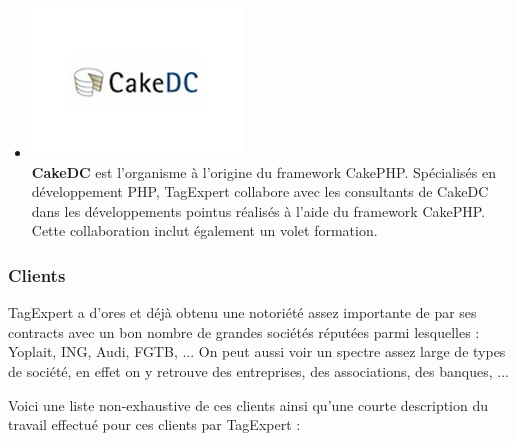 \documentclass{article}
\begin{document}
\begin{sffamily}
\begin{itemize}
\item[] \includegraphics[scale=0.35]{cakedc.jpg}\\
\textbf{CakeDC} est l’organisme à l’origine du framework CakePHP. Spécialisés en développement PHP, TagExpert collabore avec les consultants de CakeDC dans les 
développements pointus réalisés à l’aide du framework CakePHP. Cette collaboration inclut également un volet formation.
\end{itemize}

\subsubsection{Clients}

TagExpert a d'ores et déjà obtenu une notoriété assez importante de par ses contracts avec un bon nombre de grandes sociétés réputées parmi lesquelles : Yoplait, ING, 
Audi, FGTB, ... On peut aussi voir un spectre assez large de types de société, en effet on y retrouve des entreprises, des associations, des banques, ...

Voici une liste non-exhaustive de ces clients ainsi qu'une courte description du travail effectué pour ces clients par TagExpert :


\end{sffamily}
\end{document}
